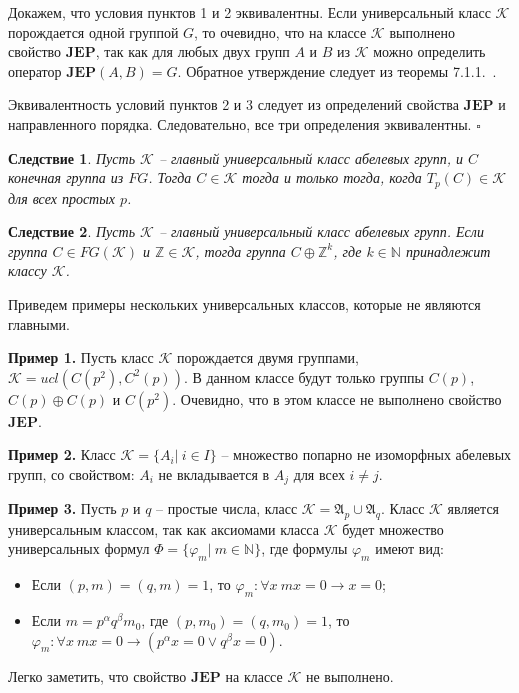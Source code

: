 \documentclass[a4paper,11pt,twoside]{article}
\newtheorem{corollary}{Следствие}[section]
\def\proof{{\noindent{\bf Доказательство.}} }
\def\A{{\mathfrak{A}}}
\def\K{{\mathcal{K}}}
\def\Z{{\mathbb{Z}}}
\def\N{{\mathbb{N}}}
\def\JEP{{\textbf{JEP}}}
\begin{document}
\proof Докажем, что условия пунктов 1 и 2 эквивалентны. Если универсальный класс $\K$ порождается одной группой $G$, то очевидно, что на классе $\K$ выполнено свойство $\JEP$, так как для любых двух групп $A$ и $B$ из $\K$ можно определить оператор $\JEP(A, B) = G$. Обратное утверждение следует из теоремы 7.1.1.~\cite{Hodges}.

Эквивалентность условий пунктов 2 и 3 следует из определений свойства $\JEP$ и направленного порядка. Следовательно, все три определения эквивалентны. $\square$


\begin{corollary}\label{cor:MainClass1}
Пусть $\K$ -- главный универсальный класс абелевых групп, и $C$ конечная группа из $FG$. Тогда $C \in \K$ тогда и только тогда, когда $T_p(C) \in \K$ для всех простых $p$.
\end{corollary}

\begin{corollary}\label{cor:MainClass2}
Пусть $\K$ -- главный универсальный класс абелевых групп. Если группа $C \in FG(\K)$ и $\Z \in \K$, тогда группа $C \oplus \Z^k$, где $k \in \N$ принадлежит классу $\K$.
\end{corollary}

Приведем примеры нескольких универсальных классов, которые не являются главными.

\noindent \textbf{Пример 1.} Пусть класс $\K$ порождается двумя группами, $\K = ucl(C(p^2), C^2(p))$. В данном классе будут только группы $C(p)$, $C(p) \oplus C(p)$ и $C(p^2)$. Очевидно, что в этом классе не выполнено свойство $\JEP$.

\noindent \textbf{Пример 2.} Класс $\K = \{A_i | \ i \in I\}$ -- множество попарно не изоморфных абелевых групп, со свойством: $A_i$ не вкладывается в $A_j$ для всех $i \neq j$.

\noindent \textbf{Пример 3.} Пусть $p$ и $q$ -- простые числа, класс $\K = \A_p \cup \A_q$. Класс $\K$ является универсальным классом, так как аксиомами класса $\K$ будет множество универсальных формул $\Phi = \{\varphi_m | \ m \in \N\}$, где формулы $\varphi_m$ имеют вид:
\begin{itemize}
 \item Если $(p,m)=(q,m)=1$, то $\varphi_m : \forall x \ mx = 0 \rightarrow x = 0$;
 \item Если $m = p^\alpha q^\beta m_0$, где $(p,m_0)=(q,m_0)=1$, то $\varphi_m : \forall x \ mx = 0 \rightarrow (p^\alpha x = 0 \vee q^\beta x = 0)$.
\end{itemize} 
Легко заметить, что свойство $\JEP$ на классе $\K$ не выполнено.
\end{document}
